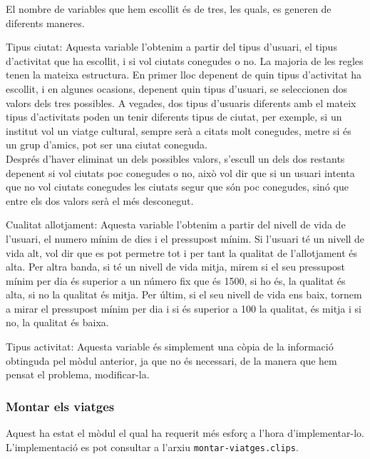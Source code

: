 \documentclass[11pt,a4paper]{article}
\begin{document}
El nombre de variables que hem escollit és de tres, les quals, es generen de diferents maneres.\\

\item[Tipus ciutat:]Aquesta variable l'obtenim a partir del tipus d'usuari, el tipus d'activitat que ha escollit, i si vol ciutats conegudes o no. La majoria de les regles tenen la mateixa estructura. En primer lloc depenent de quin tipus d'activitat ha escollit, i en algunes ocasions, depenent quin tipus d'usuari, se seleccionen dos valors dels tres possibles. A vegades, dos tipus d'usuaris diferents amb el mateix tipus d'activitats poden un tenir diferents tipus de ciutat, per exemple, si un institut vol un viatge cultural, sempre serà a citats molt conegudes, metre si és un grup d'amics, pot ser una ciutat coneguda.\\
Després d'haver eliminat un dels possibles valors, s'escull un dels dos restants depenent si vol ciutats poc conegudes o no, això vol dir que si un usuari intenta que no vol ciutats conegudes les ciutats segur que són poc conegudes, sinó que entre els dos valors serà el més desconegut.

\item[Cualitat allotjament:]Aquesta variable l'obtenim a partir del nivell de vida de l'usuari, el numero mínim de dies i el pressupost mínim. Si l'usuari té un nivell de vida alt, vol dir que es pot permetre tot i per tant la qualitat de l'allotjament és alta. Per altra banda, si té un nivell de vida mitja, mirem si el seu pressupost mínim per dia és superior a un número fix que és 1500, si ho és, la qualitat és alta, si no la qualitat és mitja. Per últim, si el seu nivell de vida ens baix, tornem a mirar el pressupost mínim per dia i si és superior a 100 la qualitat, és mitja i si no, la qualitat és baixa.

\item[Tipus activitat:] Aquesta variable és simplement una còpia de la informació obtinguda pel mòdul anterior, ja que no és necessari, de la manera que hem pensat el problema, modificar-la.


\subsubsection*{Montar els viatges}

Aquest ha estat el mòdul el qual ha requerit més esforç a l'hora d'implementar-lo. L'implementació es pot consultar a l'arxiu \texttt{montar-viatges.clips}.
\end{document}

